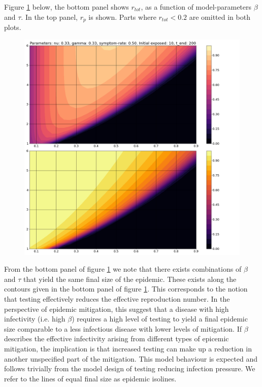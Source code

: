 \documentclass[10pt,a4paper]{article}
\begin{document}
Figure \ref{fig:TestAndBeta} below, the bottom panel shows $r_{tot}$, as a function of model-parameters $\beta$ and $\tau$. 
In the top panel, $r_p$ is shown. Parts where $r_{tot} < 0.2$ are omitted in both plots.

\begin{figure}[h]\centering
    \includegraphics[width = \linewidth]{./../Figures/TestingModelling_TestProbAndInfectivity_Split.png}
    \caption{ }\label{fig:TestAndBeta}
\end{figure}

From the bottom panel of figure \ref{fig:TestAndBeta} we note that there exists combinations of $\beta$ and $\tau$ that yield the same final size of the epidemic. 
These exists along the contours given in the bottom panel of figure \ref{fig:TestAndBeta}.
This corresponds to the notion that testing effectively reduces the effective reproduction number. 
In the perspective of epidemic mitigation, this suggest that a disease with high infectivity (i.e. high $\beta$) requires a high level of testing to yield a final epidemic size comparable to a less infectious disease with lower levels of mitigation.
If $\beta$ describes the effective infectivity arising from different types of epicemic mitigation, the implication is that increased testing can make up a reduction in another unspecified part of the mitigation.
This model behaviour is expected and follows trivially from the model design of testing reducing infection pressure.
We refer to the lines of equal final size as epidemic isolines. 
\end{document}
